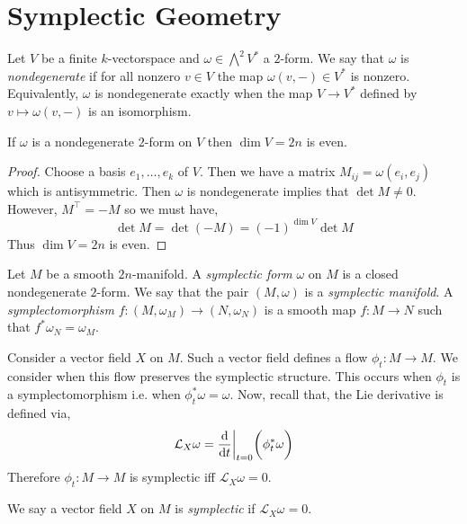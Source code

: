 \documentclass[12pt]{extarticle}
\renewcommand{\L}{\mathcal{L}}
\begin{document}
\section{Symplectic Geometry}

\begin{defn}
Let $V$ be a finite $k$-vectorspace and $\omega \in \bigwedge^2 V^*$ a $2$-form. We say that $\omega$ is \textit{nondegenerate} if for all nonzero $v \in V$ the map $\omega(v, -) \in V^*$ is nonzero. Equivalently, $\omega$ is nondegenerate exactly when the map $V \to V^*$ defined by $v \mapsto \omega(v, -)$ is an isomorphism. 
\end{defn}

\begin{lemma}
If $\omega$ is a nondegenerate $2$-form on $V$ then $\dim{V} = 2n$ is even.
\end{lemma}

\begin{proof}
Choose a basis $e_1, \dots, e_k$ of $V$. Then we have a matrix $M_{ij} = \omega(e_i, e_j)$ which is antisymmetric. Then $\omega$ is nondegenerate implies that $\det{M} \neq 0$. However, $M^\top = - M$ so we must have,
\[ \det{M} = \det{(-M)} = (-1)^{\dim{V}} \det{M} \]
Thus $\dim{V} = 2n$ is even.
\end{proof}

\begin{defn}
Let $M$ be a smooth $2n$-manifold. A \textit{symplectic form} $\omega$ on $M$ is a closed nondegenerate $2$-form. We say that the pair $(M, \omega)$ is a \textit{symplectic manifold}. A \textit{symplectomorphism} $f : (M, \omega_M) \to (N, \omega_N)$ is a smooth map $f : M \to N$ such that $f^* \omega_N = \omega_M$. 
\end{defn}

\begin{rmk}
Consider a vector field $X$ on $M$. Such a vector field defines a flow $\phi_t : M \to M$. We consider when this flow preserves the symplectic structure. This occurs when $\phi_t$ is a symplectomorphism i.e. when $\phi_t^* \omega = \omega$. Now, recall that, the Lie derivative is defined via,
\[ \L_X \omega = \deriv{}{t} \bigg|_{t = 0} \bigg( \phi^*_t \omega \bigg) \]
Therefore $\phi_t : M \to M$ is symplectic iff $\L_X \omega = 0$.
\end{rmk}

\begin{defn}
We say a vector field $X$ on $M$ is \textit{symplectic} if $\L_X \omega = 0$. 
\end{defn}
\end{document}
